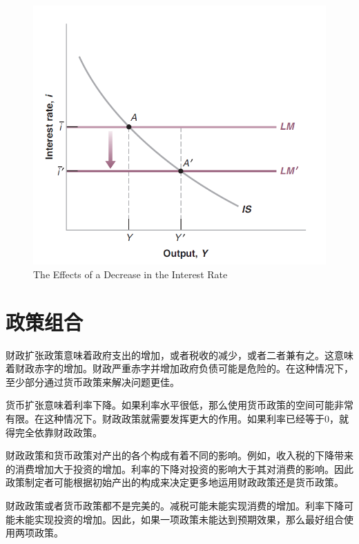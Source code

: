 \documentclass{article}
\begin{document}
\begin{figure}[H] %
	\centering %
	\includegraphics[width=1\textwidth]{5_6} %
	\caption{The Effects of a Decrease
		in the Interest Rate} %
	\label{Fig.main7} %
\end{figure}

\section{政策组合}

财政扩张政策意味着政府支出的增加，或者税收的减少，或者二者兼有之。这意味着财政赤字的增加。财政严重赤字并增加政府负债可能是危险的。在这种情况下，至少部分通过货币政策来解决问题更佳。

货币扩张意味着利率下降。如果利率水平很低，那么使用货币政策的空间可能非常有限。在这种情况下。财政政策就需要发挥更大的作用。如果利率已经等于0，就得完全依靠财政政策。

财政政策和货币政策对产出的各个构成有着不同的影响。例如，收入税的下降带来的消费增加大于投资的增加。利率的下降对投资的影响大于其对消费的影响。因此政策制定者可能根据初始产出的构成来决定更多地运用财政政策还是货币政策。

财政政策或者货币政策都不是完美的。减税可能未能实现消费的增加。利率下降可能未能实现投资的增加。因此，如果一项政策未能达到预期效果，那么最好组合使用两项政策。
\end{document}
